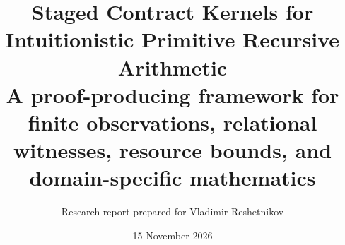 \documentclass[10pt]{article}
\title{\textbf{Staged Contract Kernels for Intuitionistic Primitive Recursive Arithmetic}\\[0.4em]
\large A proof-producing framework for finite observations, relational witnesses, resource bounds, and domain-specific mathematics}
\author{Research report prepared for Vladimir Reshetnikov}
\date{15 November 2026}
\begin{document}
\maketitle

\begin{abstract}

\end{abstract}

\tableofcontents
\newpage















\appendix


\end{document}
